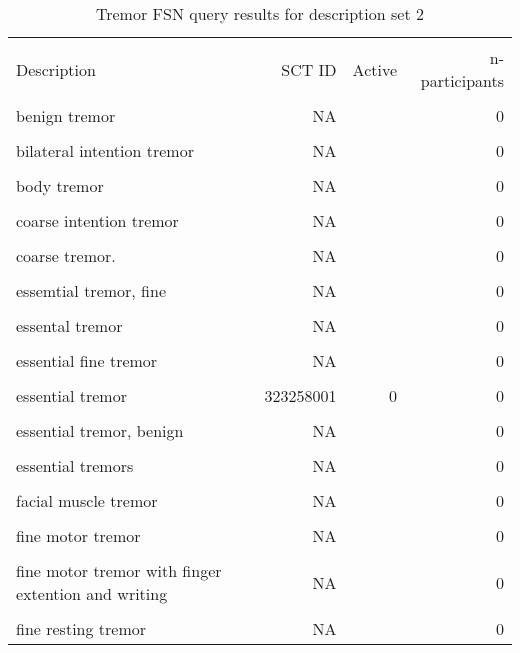 \documentclass[10pt, letterpaper]{article}
\begin{document}
\begin{spacing}{1.0}
\begin{footnotesize}
    \begin{longtable}[H]{p{4in}rrr}
        \caption{Tremor FSN query results for description set 2}\\[-4pt]
        \hline\\[-6pt]
        Description & SCT ID & Active & n-participants\\[2pt]
        \hline\\[-4pt]
        \endhead
        benign tremor & NA &  & 0\\
        & & &\\[-6pt]
        bilateral intention tremor & NA &  & 0\\
        & & &\\[-6pt]
        body tremor & NA &  & 0\\
        & & &\\[-6pt]
        coarse intention tremor & NA &  & 0\\
        & & &\\[-6pt]
        coarse tremor. & NA &  & 0\\
        & & &\\[-6pt]
        essemtial tremor, fine & NA &  & 0\\
        & & &\\[-6pt]
        essental tremor & NA &  & 0\\
        & & &\\[-6pt]
        essential fine tremor & NA &  & 0\\
        & & &\\[-6pt]
        essential tremor & 323258001 & 0 & 0\\
        & & &\\[-6pt]
        essential tremor, benign & NA &  & 0\\
        & & &\\[-6pt]
        essential tremors & NA &  & 0\\
        & & &\\[-6pt]
        facial muscle tremor & NA &  & 0\\
        & & &\\[-6pt]
        fine motor tremor & NA &  & 0\\
        & & &\\[-6pt]
        fine motor tremor with finger extention and writing & NA &  & 0\\
        & & &\\[-6pt]
        fine resting tremor & NA &  & 0\\

\end{longtable}
\end{footnotesize}
\end{spacing}
\end{document}
